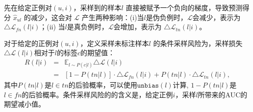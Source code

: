 先在给定正例对$(u,i)$，采样到的样本$l$ 直接被赋予一个负向的梯度，导致预测得分 $\hat{x}_{ul}$ 的减少，这会对 $\mathcal{L}$ 产生两种影响：(i)当$l$是伪负例时，$\mathcal{L}$会减少，表示为 $\triangle \mathcal{L}_{fn}(l|i)$；(ii) 当$l$是真负例时，$\mathcal{L}$会增加，表示为 $\triangle \mathcal{L}_{tn}(l|i)$。

\begin{definition}[条件采样风险]
对于给定的正例对$(u,i)$，定义采样未标注样本$l$ 的条件采样风险为，采样损失$\triangle \mathcal{L}(l|i)$相对于$l$的标签$c$的期望值：
	\begin{eqnarray}
		R(l|i) 
		&=&  \mathbb{E}_{l \sim P(c|l)}  \triangle \mathcal{L}(l|i)\nonumber\\
		&=&[1- P(tn|l)] \cdot \triangle \mathcal{L}_{fn}(l|i) + P(tn|l)\cdot \triangle \mathcal{L}_{tn}(l|i)\label{eq:condirisk},
	\end{eqnarray}
其中$P(tn|l)$是$l\in tn$的后验概率，可以使用$\mathtt{unbias}(l)$计算, $ 1 - P(tn|l)$是$l\in fn$的后验概率。条件采样风险的的含义是，给定正例$i$，采样$l$所带来的AUC的期望减小值。
\end{definition}


